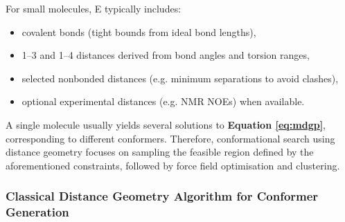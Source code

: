 \documentclass[12pt]{article}
\begin{document}
For small molecules, E typically includes:
\begin{itemize}
\item covalent bonds (tight bounds from ideal bond lengths),
\item 1–3 and 1–4 distances derived from bond angles and torsion ranges,
\item selected nonbonded distances (e.g. minimum separations to avoid clashes),
\item optional experimental distances (e.g. NMR NOEs) when available.
\end{itemize}

A single molecule usually yields several solutions to \textbf{Equation \ref{eq:mdgp}}, corresponding to different conformers. Therefore, conformational search using distance geometry focuses on sampling the feasible region defined by the aforementioned constraints, followed by force field optimisation and clustering.\cite{CH2_spellmeyer_dg_conf_1997,CH2_riniker_landrum_2015}

\subsubsection{Classical Distance Geometry Algorithm for Conformer Generation}
\end{document}
